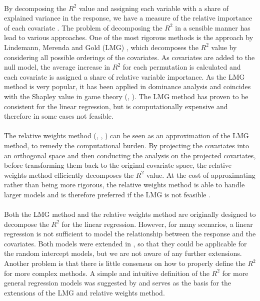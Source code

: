 \\
By decomposing the $R^2$ value and assigning each variable with a share of explained variance in the response, we have a measure of the relative importance of each covariate \citep{gromping_relaimpo}. The problem of decomposing the $R^2$ in a sensible manner has lead to various approaches. One of the most rigorous methods is the approach by Lindemann, Merenda and Gold (LMG) \citep{Lindeman1980}, which decomposes the $R^2$ value by considering all possible orderings of the covariates. As covariates are added to the null model, the average increase in $R^2$ for each permutation is calculated and each covariate is assigned a share of relative variable importance. As the LMG method is very popular, it has been applied in dominance analysis \citep{budescu1993dominance} and coincides with the Shapley value in game theory (\citet{Shapley1953StochasticG}, \citet{Lipovetsky_GameTheory}). The LMG method has proven to be consistent for the linear regression, but is computationally expensive and therefore in some cases not feasible. 
\\
\\
The relative weights method (\citet{johnson_minimization_trace}, \citet{Fabbris1980}, \citet{Genizi_relative_weights}) can be seen as an approximation of the LMG method, to remedy the computational burden. By projecting the covariates into an orthogonal space and then conducting the analysis on the projected covariates, before transforming them back to the original covariate space, the relative weights method efficiently decomposes the $R^2$ value. At the cost of approximating rather than being more rigorous, the relative weights method is able to handle larger models and is therefore preferred if the LMG is not feasible \citep{gromping_relaimpo}.
\\
\\ 
Both the LMG method and the relative weights method are originally designed to decompose the $R^2$ for the linear regression. However, for many scenarios, a linear regression is not sufficient to model the relationship between the response and the covariates. Both models were extended in \citet{matre}, so that they could be applicable for the random intercept models, but we are not aware of any further extensions. Another problem is that there is little consensus on how to properly define the $R^2$ for more complex methods. A simple and intuitive definition of the $R^2$ for more general regression models was suggested by \citet{nakagawa2013general} and serves as the basis for the extensions of the LMG and relative weights method. 
